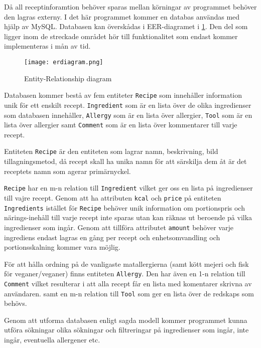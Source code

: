Då all receptinforamtion behöver sparas mellan körningar av programmet
behöver den lagras externy. I det här programmet kommer en databas
användas med hjälp av MySQL. Databasen kan överskådas i
EER-diagramet i \ref{fig:erdiagram}. Den del som ligger inom de streckade området hör
till funktionalitet som endast kommer implementeras i mån av tid.

\begin{figure}[H]
        \centering
        \texttt{[image: erdiagram.png]}
        \caption{Entity-Relationship diagram}
        \label{fig:erdiagram}
\end{figure}

Databasen kommer bestå av fem entiteter \verb+Recipe+ som innehåller
information unik för ett enskilt recept. \verb+Ingredient+ som är en lista
över de olika ingredienser som databasen innehåller, \verb+Allergy+
som är en lista över allergier, \verb+Tool+ som är en lista över allergier samt
\verb+Comment+ som är en lista över kommentarer till varje recept.

Entiteten \verb+Recipe+ är den entiteten som lagrar namn, beskrivning, bild
tillagningsmetod, då recept skall ha unika namn för att särskilja dem åt är det
receptets namn som agerar primärnyckel.

\verb+Recipe+ har en m-n relation till \verb+Ingredient+ vilket ger oss en
lista på ingredienser till vajre recept. Genom att ha attributen \verb+kcal+ och \verb+price+
på entiteten \verb+Ingredients+ istället för \verb+Recipe+ behöver unik information om
portionspris och närings-inehåll till varje recept inte sparas utan kan räknas ut beroende på vilka
ingredienser som ingår. Genom att tillföra attributet \verb+amount+ behöver varje ingrediens
endast lagras en gång per recept och enhetsomvandling och portionsskalning kommer vara möjlig.

För att hålla ordning på de vanligaste matallergierna (samt kött mejeri och fisk för
veganer/veganer) finns entiteten \verb+Allergy+. Den har även en 1-n relation till \verb+Comment+
vilket resulterar i att alla recept får en lista med komentarer skrivna av användaren. samt en
m-n relation till \verb+Tool+ som ger en lista över de redskaps som behövs.

Genom att utforma databasen enligt sagda modell kommer programmet kunna utföra sökningar olika
sökningar och filtreringar på ingredienser som ingår, inte ingår, eventuella allergener etc.



